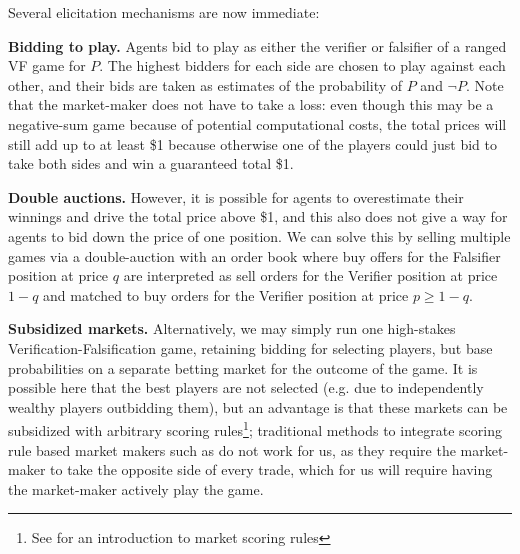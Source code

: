 \newenvironment{hproof}{%
  \renewcommand{\proofname}{Proof sketch}\proof}{\endproof}



Several elicitation mechanisms are now immediate:

\textbf{Bidding to play.} Agents bid to play as either the verifier or falsifier of a ranged VF game for $P$. The highest bidders for each side are chosen to play against each other, and their bids are taken as estimates of the probability of $P$ and $\lnot P$. Note that the market-maker does not have to take a loss: even though this may be a negative-sum game because of potential computational costs, the total prices will still add up to at least \$1 because otherwise one of the players could just bid to take both sides and win a guaranteed total \$1.

\textbf{Double auctions.} However, it is possible for agents to overestimate their winnings and drive the total price above \$1, and this also does not give a way for agents to bid down the price of one position. We can solve this by selling multiple games via a double-auction with an order book where buy offers for the Falsifier position at price $q$ are interpreted as sell orders for the Verifier position at price $1-q$ and matched to buy orders for the Verifier position at price $p\ge 1-q$.

\textbf{Subsidized markets.} Alternatively, we may simply run one high-stakes Verification-Falsification game, retaining bidding for selecting players, but base probabilities on a separate betting market for the outcome of the game. It is possible here that the best players are not selected (e.g. due to independently wealthy players outbidding them), but an advantage is that these markets can be subsidized with arbitrary scoring rules\footnote{See \cite{hansonLogarithmicMarketScoring2002} for an introduction to market scoring rules}; traditional methods to integrate scoring rule based market makers such as \cite{agrawalUnifiedFrameworkDynamic2011, chakrabortyPriceEvolutionContinuous2015} do not work for us, as they require the market-maker to take the opposite side of every trade, which for us will require having the market-maker actively play the game.


